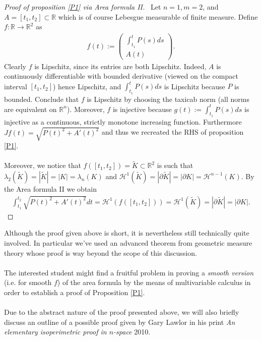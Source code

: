 \documentclass[12pt, a4paper, titlepage]{article}
\begin{document}
\begin{proof}[Proof of proposition \ref{P1} via Area formula II]  \ \newline Let $n=1,m=2$, and $A= [t_1,t_2] \subset \mathbb{R}$ which is of course Lebesgue measurable of finite measure. Define $f: \mathbb{R} \to \mathbb{R}^2 $ as 
\begin{align*}
f(t):= \begin{pmatrix}
 \int_{t_1}^t P(s) ds \\ A(t)
\end{pmatrix}.
\end{align*}
Clearly $f$ is Lipschitz, since its entries are both Lipschitz. Indeed, $A$ is continuously differentiable with bounded derivative (viewed on the compact interval $[t_1,t_2]$) hence Lipschitz, and $\int_{t_1}^t P(s)ds$ is Lipschitz because $P$ is bounded. Conclude that $f$ is Lipschitz by choosing the taxicab norm (all norms are equivalent on $\mathbb{R}^n$). Moreover, $f$ is injective because $g(t):= \int_{t_1}^t P(s)ds$ is injective as a continuous, strictly monotone increasing function. Furthermore  $Jf(t)= \sqrt{ P(t)^2 + A'(t)^2}$ and thus we recreated the RHS of proposition \ref{P1}.
\\\\
Moreover, we notice that $f([t_1,t_2])= \widetilde{K} \subset \mathbb{R}^2$ is such that $\lambda_2(\widetilde{K})= |\widetilde{K}|=|K|= \lambda_n(K)$ and $\mathcal{H}^1( \widetilde{K})= | \partial \widetilde{K}| = | \partial K|= \mathcal{H}^{n-1}(K)$. By the Area formula II we obtain 
\begin{align*}
 \int_{t_1}^{t_2}  \sqrt{ P(t)^2 + A'(t)^2 } dt = \mathcal{H}^1 (f([t_1,t_2]))= \mathcal{H}^1(\widetilde{K})= | \partial \widetilde{K}|= | \partial K|.
\end{align*}
\end{proof}
Although the proof given above is short, it is nevertheless still technically quite involved. In particular we've used an advanced theorem from geometric measure theory whose proof is way beyond the scope of this discussion. 
\\\\
The interested student might find a fruitful problem in proving a \textit{smooth version} (i.e. for smooth $f$) of the area formula by the means of multivariable calculus in order to establish a proof of Proposition \ref{P1}. 
\\\\
Due to the abstract nature of the proof presented above, we will also briefly discuss an outline of a possible proof given by Gary Lawlor in his print \textit{An elementary isoperimetric proof in $n$-space} 2010. \newpage
\end{document}
